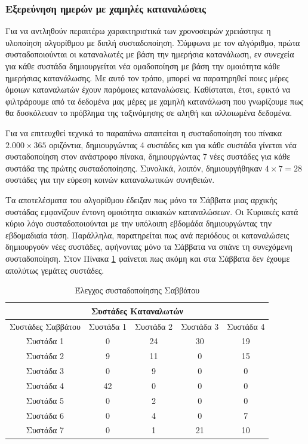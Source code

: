 \subsubsection{Εξερεύνηση ημερών με χαμηλές καταναλώσεις}
Για να αντληθούν περαιτέρω χαρακτηριστικά των χρονοσειρών χρειάστηκε η υλοποίηση αλγορίθμου με διπλή συσταδοποίηση. Σύμφωνα με τον αλγόριθμο, πρώτα συσταδοποιούνται οι καταναλωτές με βάση την ημερήσια κατανάλωση, εν συνεχεία για κάθε συστάδα δημιουργείται νέα ομαδοποίηση με βάση την ομοιότητα κάθε ημερήσιας κατανάλωσης. Με αυτό τον τρόπο, μπορεί να παρατηρηθεί ποιες μέρες όμοιων καταναλωτών έχουν παρόμοιες καταναλώσεις. Καθίσταται, έτσι, εφικτό να φιλτράρουμε από τα δεδομένα μας μέρες με χαμηλή κατανάλωση που γνωρίζουμε πως θα δυσκόλευαν το πρόβλημα της ταξινόμησης σε αληθή και αλλοιωμένα δεδομένα.\par
Για να επιτευχθεί τεχνικά το παραπάνω απαιτείται η συσταδοποίηση του πίνακα $2.000 \times 365$ οριζόντια, δημιουργώντας 4 συστάδες και για κάθε συστάδα γίνεται νέα συσταδοποίηση στον ανάστροφο πίνακα, δημιουργώντας 7 νέες συστάδες για κάθε συστάδα της πρώτης συσταδοποίησης. Συνολικά, λοιπόν, δημιουργήθηκαν $4 \times 7 = 28$ συστάδες για την εύρεση κοινών καταναλωτικών συνηθειών.\par
Τα αποτελέσματα του αλγορίθμου έδειξαν πως μόνο τα Σάββατα μιας αρχικής συστάδας εμφανίζουν έντονη ομοιότητα οικιακών καταναλώσεων. Οι Κυριακές κατά κύριο λόγο συσταδοποιούνται με την υπόλοιπη εβδομάδα δημιουργώντας την εβδομαδιαία τάση. Παράλληλα, παρατηρείται πως ανά περιόδους οι καταναλώσεις δημιουργούν νέες συστάδες, αφήνοντας μόνο τα Σάββατα να σπάνε τη συνεχόμενη συσταδοποίηση. Στον Πίνακα \ref{tab:double clustering} φαίνεται πως ακόμη και στα Σάββατα δεν έχουμε απολύτως γεμάτες συστάδες.

\begin{table}[ht!]
\centering
\begin{tabular}{ |c||c|c|c|c|  }
 \hline
 \multicolumn{5}{|c|}{Συστάδες Καταναλωτών} \\
 \hline
 Συστάδες Σαββάτου  & Συστάδα 1& Συστάδα 2 &Συστάδα 3 &Συστάδα 4\\
 \hline
 Συστάδα 1 & 0  & 24 & 30 & 19\\
 Συστάδα 2 & 9  & 11 & 0  & 15\\
 Συστάδα 3 & 0  & 9  & 0  & 0\\
 Συστάδα 4 & 42 & 0  & 0  & 0\\
 Συστάδα 5 & 0  & 2  & 0  & 0\\
 Συστάδα 6 & 0  & 4  & 0  & 7\\
 Συστάδα 7 & 0  & 1  & 21 & 10\\
 \hline
\end{tabular}
\caption{Έλεγχος συσταδοποίησης Σαββάτου}
\label{tab:double clustering}
\end{table}

